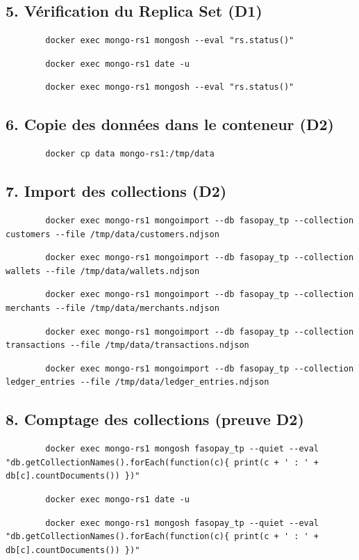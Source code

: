 \documentclass[11pt,a4paper]{article}
\begin{document}
	\subsection*{5. Vérification du Replica Set (D1)}
	\begin{lstlisting}
		docker exec mongo-rs1 mongosh --eval "rs.status()"
	\end{lstlisting}
	\begin{lstlisting}
		docker exec mongo-rs1 date -u
	\end{lstlisting}
	\begin{lstlisting}
		docker exec mongo-rs1 mongosh --eval "rs.status()"
	\end{lstlisting}
	\subsection*{6. Copie des données dans le conteneur (D2)}
	\begin{lstlisting}
		docker cp data mongo-rs1:/tmp/data
	\end{lstlisting}
	\subsection*{7. Import des collections (D2)}
	\begin{lstlisting}
		docker exec mongo-rs1 mongoimport --db fasopay_tp --collection customers --file /tmp/data/customers.ndjson
	\end{lstlisting}
	\begin{lstlisting}
		docker exec mongo-rs1 mongoimport --db fasopay_tp --collection wallets --file /tmp/data/wallets.ndjson
	\end{lstlisting}
	\begin{lstlisting}
		docker exec mongo-rs1 mongoimport --db fasopay_tp --collection merchants --file /tmp/data/merchants.ndjson
	\end{lstlisting}
	\begin{lstlisting}
		docker exec mongo-rs1 mongoimport --db fasopay_tp --collection transactions --file /tmp/data/transactions.ndjson
	\end{lstlisting}
	\begin{lstlisting}
		docker exec mongo-rs1 mongoimport --db fasopay_tp --collection ledger_entries --file /tmp/data/ledger_entries.ndjson
	\end{lstlisting}
	\subsection*{8. Comptage des collections (preuve D2)}
	\begin{lstlisting}
		docker exec mongo-rs1 mongosh fasopay_tp --quiet --eval "db.getCollectionNames().forEach(function(c){ print(c + ' : ' + db[c].countDocuments()) })"
	\end{lstlisting}
	\begin{lstlisting}
		docker exec mongo-rs1 date -u
	\end{lstlisting}
	\begin{lstlisting}
		docker exec mongo-rs1 mongosh fasopay_tp --quiet --eval "db.getCollectionNames().forEach(function(c){ print(c + ' : ' + db[c].countDocuments()) })"
	\end{lstlisting}
\end{document}

